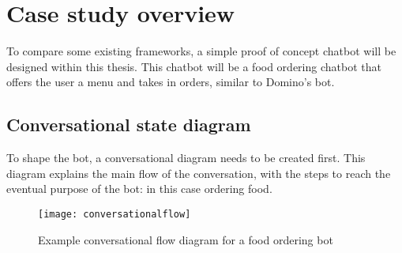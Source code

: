\chapter{Case study overview}

To compare some existing frameworks, a simple proof of concept chatbot will be designed within this thesis. This chatbot will be a food ordering chatbot that offers the user a menu and takes in orders, similar to Domino's bot.

\section{Conversational state diagram}

To shape the bot, a conversational diagram needs to be created first. This diagram explains the main flow of the conversation, with the steps to reach the eventual purpose of the bot: in this case ordering food.

\begin{figure}[ht]
	\centering
	\texttt{[image: conversationalflow]}
	\caption{Example conversational flow diagram for a food ordering bot}
	\label{fig:conversationalflow}
\end{figure}
